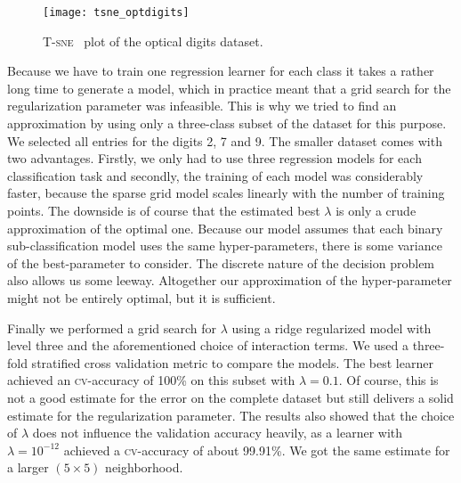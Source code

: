 \begin{figure}[htb]
  \centering
  \texttt{[image: tsne\_optdigits]}
  \caption{\textsc{T-sne}~\cite{tsne} plot of the optical digits dataset.}
  \label{fig:optdigit-tsne}
\end{figure}

Because we have to train one regression learner for each class it takes a rather
long time to generate a model, which in practice meant that a grid search for
the regularization parameter was infeasible.
This is why we tried to find an approximation by using only a three-class subset
of the dataset for this purpose.
We selected all entries for the digits 2, 7 and 9.
The smaller dataset comes with two advantages.
Firstly, we only had to use three regression models for each classification
task and secondly, the training of each model was considerably faster, because
the sparse grid model scales linearly with the number of training points.
The downside is of course that the estimated best \(\lambda\) is only a crude
approximation of the optimal one.
Because our model assumes that each binary sub-classification model uses the same hyper-parameters, there is some variance of the best-parameter to consider.
The discrete nature of the decision problem also allows us some leeway.
Altogether our approximation of the hyper-parameter might not be entirely optimal, but it is sufficient.

Finally we performed a grid search for \(\lambda\) using a ridge regularized model with level three and the aforementioned choice of interaction terms.
We used a three-fold stratified cross validation metric to compare the models.
The best learner achieved an \textsc{cv}-accuracy of 100\% on this subset with \(\lambda = 0.1\).
Of course, this is not a good estimate for the error on the complete dataset but still delivers a solid estimate for the regularization parameter.
The results also showed that the choice of \(\lambda\) does not influence the
validation accuracy heavily, as a learner with \(\lambda = 10^{-12}\) achieved a
\textsc{cv}-accuracy of about 99.91\%.
We got the same estimate for a larger \((5 \times 5)\) neighborhood.

